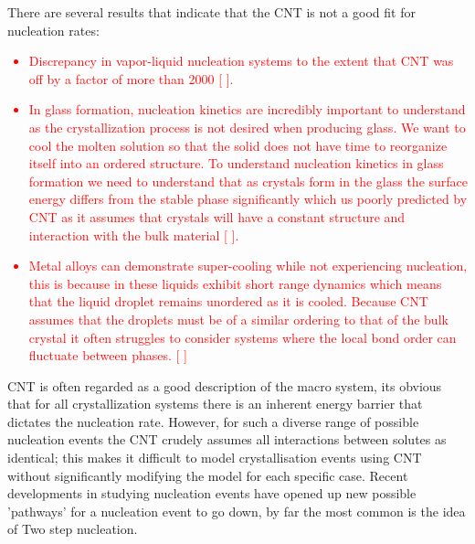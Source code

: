 There are several results that indicate that the CNT is not a good fit for nucleation rates:
\textcolor{red}{
	\begin{itemize}
		\item Discrepancy in vapor-liquid nucleation systems to the extent that CNT was off by a factor of more than 2000 [ ]. 
		\item In glass formation, nucleation kinetics are incredibly important to understand as the crystallization process is not desired when producing glass. We want to cool the molten solution so that the solid does not have time to reorganize itself into an ordered structure. To understand nucleation kinetics in glass formation we need to understand that as crystals form in the glass the surface energy differs from the stable phase significantly which us poorly predicted by CNT as it assumes that crystals will have a constant structure and interaction with the bulk material [ ]. 
		\item Metal alloys can demonstrate super-cooling while not experiencing nucleation, this is because in these liquids exhibit short range dynamics which means that the liquid droplet remains unordered as it is cooled. Because CNT assumes that the droplets must be of a similar ordering to that of the bulk crystal it often struggles to consider systems where the local bond order can fluctuate between phases. [ ]
	\end{itemize}
}

CNT is often regarded as a good description of the macro system, its obvious that for all crystallization systems there is an inherent energy barrier that dictates the nucleation rate. However, for such a diverse range of possible nucleation events the CNT crudely assumes all interactions between solutes as identical; this makes it difficult to model crystallisation events using CNT without significantly modifying the model for each specific case. Recent developments in studying nucleation events have opened up new possible 'pathways' for a nucleation event to go down, by far the most common is the idea of Two step nucleation.

